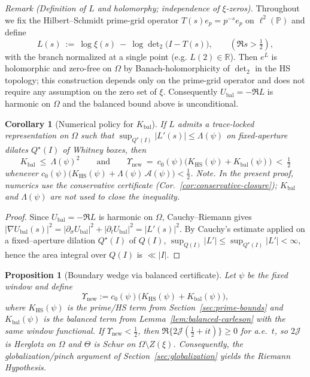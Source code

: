 \documentclass[11pt]{article}
\newtheorem{proposition}[theorem]{Proposition}
\newtheorem{corollary}[theorem]{Corollary}
\theoremstyle{definition}
\theoremstyle{remark}
\newcommand{\R}{\mathbb{R}}
\begin{document}
\noindent\emph{Remark (Definition of $L$ and holomorphy; independence of $\xi$-zeros).}
Throughout we fix the Hilbert--Schmidt prime-grid operator $T(s)e_p=p^{-s}e_p$ on $\ell^2(\mathbb P)$ and define
\[
L(s)\ :=\ \log\xi(s)\ -\ \log\det\nolimits_2\bigl(I-T(s)\bigr),\qquad (\Re s>\tfrac12),
\]
with the branch normalized at a single point (e.g. $L(2)\in\R$). Then $e^{L}$ is holomorphic and zero-free on $\Omega$ by Banach-holomorphicity of $\det_2$ in the HS topology; this construction depends only on the prime-grid operator and does not require any assumption on the zero set of $\xi$. Consequently $U_{\mathrm{bal}}=-\Re L$ is harmonic on $\Omega$ and the balanced bound above is unconditional.

\begin{corollary}[Numerical policy for $K_{\mathrm{bal}}$]\label{cor:Kbal-policy}
If $L$ admits a trace-locked representation on $\Omega$ such that $\sup_{Q^\star(I)}|L'(s)|\le \Lambda(\psi)$ on fixed-aperture dilates $Q^\star(I)$ of Whitney boxes, then
\[
K_{\mathrm{bal}}\ \le\ \Lambda(\psi)^2\qquad\text{and}\qquad \Upsilon_{\mathrm{new}}\ =\ c_0(\psi)\Big(K_{\mathrm{HS}}(\psi)+K_{\mathrm{bal}}(\psi)\Big)\ <\ \tfrac12
\]
whenever $c_0(\psi)\big(K_{\mathrm{HS}}(\psi)+\Lambda(\psi)\,\mathcal A(\psi)\big)<\tfrac12$. \emph{Note.} In the present proof, numerics use the conservative certificate (Cor.~\ref{cor:conservative-closure}); $K_{\mathrm{bal}}$ and $\Lambda(\psi)$ are not used to close the inequality.
\end{corollary}

\begin{proof}
Since $U_{\mathrm{bal}}=-\Re L$ is harmonic on $\Omega$, Cauchy--Riemann gives
$|\nabla U_{\mathrm{bal}}(s)|^2 = |\partial_\sigma U_{\mathrm{bal}}|^2 + |\partial_t U_{\mathrm{bal}}|^2 = |L'(s)|^2$.
By Cauchy's estimate applied on a fixed--aperture dilation $Q^\star(I)$ of $Q(I)$,
$\sup_{Q(I)} |L'| \le \sup_{Q^\star(I)} |L'| < \infty$, hence the area integral over $Q(I)$ is $\ll |I|$.
\end{proof}

\begin{proposition}[Boundary wedge via balanced certificate]\label{prop:wedge-balanced}
Let $\psi$ be the fixed window and define
\[
\Upsilon_{\mathrm{new}} := c_0(\psi)\Big( K_{\mathrm{HS}}(\psi) + K_{\mathrm{bal}}(\psi) \Big),
\]
where $K_{\mathrm{HS}}(\psi)$ is the prime/HS term from Section~\ref{sec:prime-bounds} and
$K_{\mathrm{bal}}(\psi)$ is the balanced term from Lemma~\ref{lem:balanced-carleson} with the same window functional.
If $\Upsilon_{\mathrm{new}}<\tfrac12$, then $\Re\{2\mathcal J(\tfrac12+it)\}\ge 0$ for a.e.~$t$,
so $2\mathcal J$ is Herglotz on $\Omega$ and $\Theta$ is Schur on $\Omega\setminus Z(\xi)$.
Consequently, the globalization/pinch argument of Section~\ref{sec:globalization} yields the Riemann Hypothesis.
\end{proposition}
\end{document}
